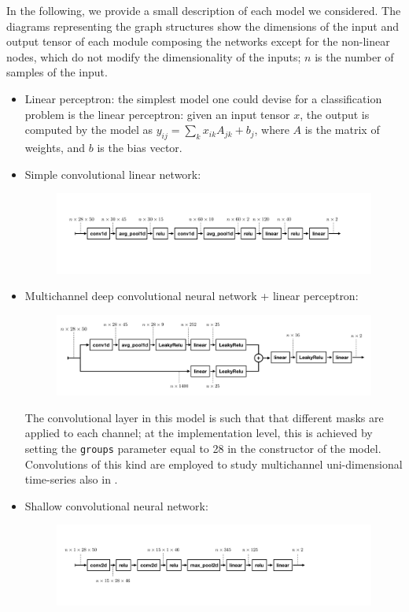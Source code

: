 \documentclass{article}
\begin{document}
In the following, we provide a small description of each model we considered. The diagrams representing the graph structures show the dimensions of the input and output tensor of each module composing the networks except for the non-linear nodes, which do not modify the dimensionality of the inputs; $n$ is the number of samples of the input.
\begin{itemize}
\item Linear perceptron: the simplest model one could devise for a classification problem is the linear perceptron:  given an input tensor $x$, the output is computed by the model as $y_{ij} = \sum_{k}x_{ik} A_{jk} + b_{j}$, where $A$ is the matrix of weights, and $b$ is the bias vector.
\item Simple convolutional linear network:
\begin{figure}[h]
\centering
\includegraphics[width=\textwidth, clip=true,trim=100 300 295 230]{fig/conv1.pdf}
\end{figure}

\item Multichannel deep convolutional neural network + linear perceptron:
\begin{figure}[h!]
\centering
\includegraphics[width=\textwidth, clip=true,trim=30 40 70 50]{fig/conv2.pdf}
\end{figure}

The convolutional layer in this model is such that that different masks are applied to each channel; at the implementation level, this is achieved by setting the \verb|groups| parameter equal to 28 in the constructor of the model. Convolutions of this kind are employed to study multichannel uni-dimensional time-series also in \cite{zheng2014time}.
\item Shallow convolutional neural network:
\begin{figure}[h!]
\centering
\includegraphics[width=\textwidth, clip=true,trim=80 200 520 200]{fig/conv3.pdf}
\end{figure}


\end{itemize}
\end{document}
